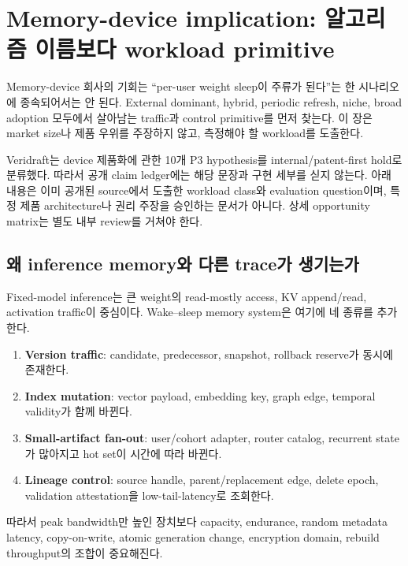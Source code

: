 \chapter{Memory-device implication: 알고리즘 이름보다 workload primitive}
\label{STC-S14}

Memory-device 회사의 기회는 ``per-user weight sleep이 주류가 된다''는 한 시나리오에 종속되어서는 안
된다. External dominant, hybrid, periodic refresh, niche, broad adoption 모두에서 살아남는 traffic과
control primitive를 먼저 찾는다. 이 장은 market size나 제품 우위를 주장하지 않고, 측정해야 할
workload를 도출한다.

\begin{cautionbox}
Veridraft는 device 제품화에 관한 10개 P3 hypothesis를 internal/patent-first hold로 분류했다. 따라서
공개 claim ledger에는 해당 문장과 구현 세부를 싣지 않는다. 아래 내용은 이미 공개된 source에서 도출한
workload class와 evaluation question이며, 특정 제품 architecture나 권리 주장을 승인하는 문서가 아니다.
상세 opportunity matrix는 별도 내부 review를 거쳐야 한다.
\end{cautionbox}

\section{왜 inference memory와 다른 trace가 생기는가}

Fixed-model inference는 큰 weight의 read-mostly access, KV append/read, activation traffic이 중심이다.
Wake--sleep memory system은 여기에 네 종류를 추가한다.

\begin{enumerate}
  \item \textbf{Version traffic}: candidate, predecessor, snapshot, rollback reserve가 동시에 존재한다.
  \item \textbf{Index mutation}: vector payload, embedding key, graph edge, temporal validity가 함께 바뀐다.
  \item \textbf{Small-artifact fan-out}: user/cohort adapter, router catalog, recurrent state가 많아지고 hot set이
  시간에 따라 바뀐다.
  \item \textbf{Lineage control}: source handle, parent/replacement edge, delete epoch, validation attestation을
  low-tail-latency로 조회한다.
\end{enumerate}

따라서 peak bandwidth만 높인 장치보다 capacity, endurance, random metadata latency, copy-on-write,
atomic generation change, encryption domain, rebuild throughput의 조합이 중요해진다.

